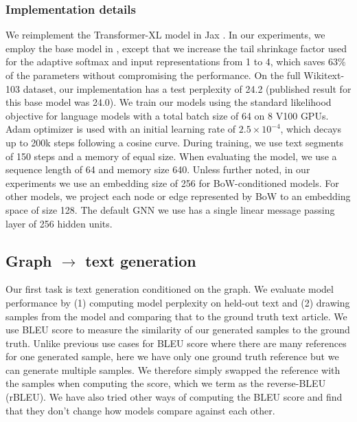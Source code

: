 \documentclass[11pt]{article}
\begin{document}
\subsubsection{Implementation details}
We reimplement the Transformer-XL model in Jax \cite{jax2018github}. In our experiments, we employ the base model in \cite{dai2019transformer}, except that we increase the tail shrinkage factor used for the adaptive softmax and input representations from 1 to 4, which saves $63\%$ of the parameters without compromising the performance. On the full Wikitext-103 dataset, our implementation has a test perplexity of 24.2 (published result for this base model was 24.0). We train our models using the standard likelihood objective for language models with a total batch size of 64 on 8 V100 GPUs. Adam optimizer is used with an initial learning rate of $2.5\times10^{-4}$, which decays up to 200k steps following a cosine curve. During training, we use text segments of 150 steps and a memory of equal size. When evaluating the model, we use a sequence length of 64 and memory size 640. Unless further noted, in our experiments we use an embedding size of 256 for BoW-conditioned models. For other models, we project each node or edge represented by BoW to an embedding space of size 128. The default GNN we use has a single linear message passing layer of 256 hidden units.





\subsection{Graph $\rightarrow$ text generation}\label{sec:graph2text}



Our first task is text generation conditioned on the graph.  We evaluate model performance by (1) computing model perplexity on held-out text and (2) drawing samples from the model and comparing that to the ground truth text article.  We use BLEU score \cite{papineni2002bleu} to measure the similarity of our generated samples to the ground truth.  Unlike previous use cases for BLEU score where there are many references for one generated sample, here we have only one ground truth reference but we can generate multiple samples.  We therefore simply swapped the reference with the samples when computing the score, which we term as the reverse-BLEU (rBLEU).  We have also tried other ways of computing the BLEU score and find that they don't change how models compare against each other.
\end{document}
